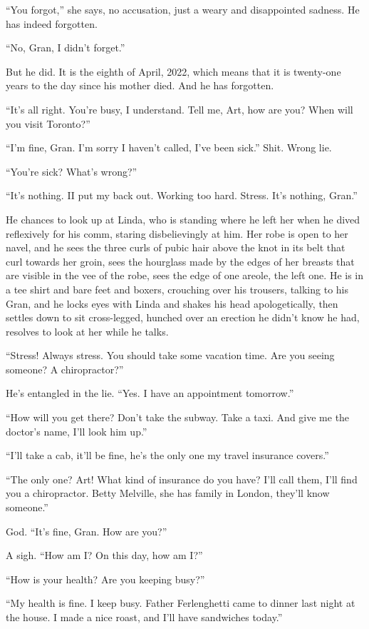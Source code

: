 “You forgot,” she says, no accusation, just a weary and
disappointed sadness. He has indeed forgotten.

“No, Gran, I didn’t forget.”

But he did. It is the eighth of April, 2022, which means that it is
twenty-one years to the day since his mother died. And he has
forgotten.

“It’s all right. You’re busy, I understand. Tell me, Art, how are
you? When will you visit Toronto?”

“I’m fine, Gran. I’m sorry I haven’t called, I’ve been sick.” Shit.
Wrong lie.

“You’re sick? What’s wrong?”

“It’s nothing. I{\dash}I put my back out. Working too hard. Stress. It’s
nothing, Gran.”

He chances to look up at Linda, who is standing where he left her
when he dived reflexively for his comm, staring disbelievingly at
him. Her robe is open to her navel, and he sees the three curls of
pubic hair above the knot in its belt that curl towards her groin,
sees the hourglass made by the edges of her breasts that are
visible in the vee of the robe, sees the edge of one areole, the
left one. He is in a tee shirt and bare feet and boxers, crouching
over his trousers, talking to his Gran, and he locks eyes with
Linda and shakes his head apologetically, then settles down to sit
cross-legged, hunched over an erection he didn’t know he had,
resolves to look at her while he talks.

“Stress! Always stress. You should take some vacation time. Are you
seeing someone? A chiropractor?”

He’s entangled in the lie. “Yes. I have an appointment tomorrow.”

“How will you get there? Don’t take the subway. Take a taxi. And
give me the doctor’s name, I’ll look him up.”

“I’ll take a cab, it’ll be fine, he’s the only one my travel
insurance covers.”

“The only one? Art! What kind of insurance do you have? I’ll call
them, I’ll find you a chiropractor. Betty Melville, she has family
in London, they’ll know someone.”

God. “It’s fine, Gran. How are you?”

A sigh. “How am I? On this day, how am I?”

“How is your health? Are you keeping busy?”

“My health is fine. I keep busy. Father Ferlenghetti came to dinner
last night at the house. I made a nice roast, and I’ll have
sandwiches today.”

